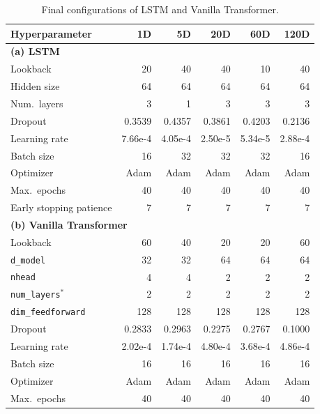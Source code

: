 \documentclass[runningheads,orivec]{llncs}
\begin{document}
\begin{table}[htbp]
\centering
\caption{Final configurations of LSTM and Vanilla Transformer.}\label{tab:config_lstm_transformer}
\setlength{\tabcolsep}{4.5pt}
\begin{tabular}{lrrrrr}
\hline
Hyperparameter & 1D & 5D & 20D & 60D & 120D \\
\hline
\multicolumn{6}{l}{\textbf{(a) LSTM}} \\
Lookback                & 20      & 40      & 40      & 10      & 40 \\
Hidden size             & 64      & 64      & 64      & 64      & 64 \\
Num.\ layers            & 3       & 1       & 3       & 3       & 3 \\
Dropout                 & 0.3539  & 0.4357  & 0.3861  & 0.4203  & 0.2136 \\
Learning rate           & 7.66e-4 & 4.05e-4 & 2.50e-5 & 5.34e-5 & 2.88e-4 \\
Batch size              & 16      & 32      & 32      & 32      & 16 \\
Optimizer               & Adam    & Adam    & Adam    & Adam    & Adam \\
Max.\ epochs            & 40      & 40      & 40      & 40      & 40 \\
Early stopping patience & 7       & 7       & 7       & 7       & 7 \\
\hline
\multicolumn{6}{l}{\textbf{(b) Vanilla Transformer}} \\
Lookback                & 60      & 40      & 20      & 20      & 60 \\
\texttt{d\_model}       & 32      & 32      & 64      & 64      & 64 \\
\texttt{nhead}          & 4       & 4       & 2       & 2       & 2 \\
\texttt{num\_layers}$^{\ast}$ & 2   & 2       & 2       & 2       & 2 \\
\texttt{dim\_feedforward} & 128   & 128     & 128     & 128     & 128 \\
Dropout                 & 0.2833  & 0.2963  & 0.2275  & 0.2767  & 0.1000 \\
Learning rate           & 2.02e-4 & 1.74e-4 & 4.80e-4 & 3.68e-4 & 4.86e-4 \\
Batch size              & 16      & 16      & 16      & 16      & 16 \\
Optimizer               & Adam    & Adam    & Adam    & Adam    & Adam \\
Max.\ epochs            & 40      & 40      & 40      & 40      & 40 \\

\end{tabular}
\end{table}
\end{document}
